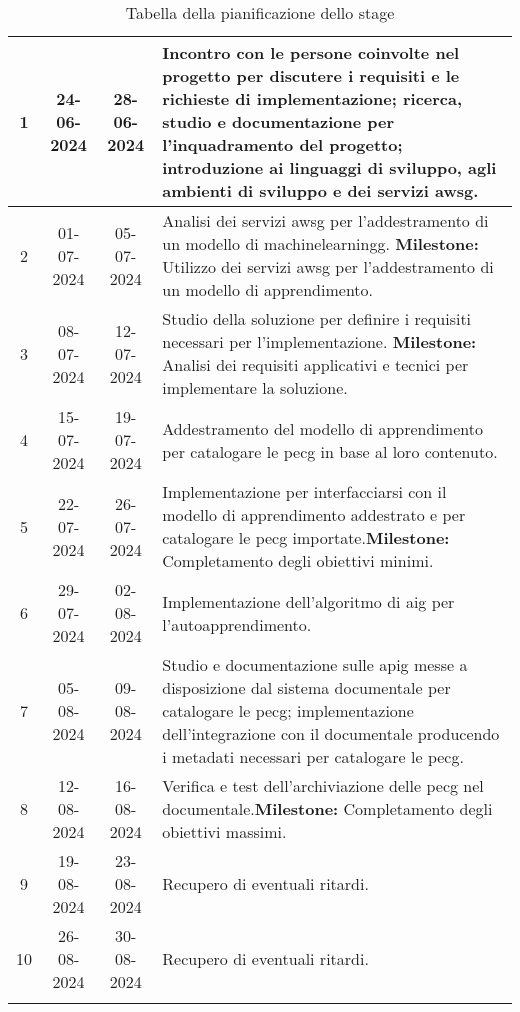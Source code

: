 \begin{longtable}{|c|c|c|p{8cm}|}
    1                  & 24-06-2024   & 28-06-2024  &
    Incontro con le persone coinvolte nel progetto per discutere i requisiti e le richieste di implementazione; ricerca, studio e documentazione per l'inquadramento del progetto; introduzione ai linguaggi di sviluppo, agli ambienti di sviluppo e dei servizi \gls{awsg}. \\
    \hline
    2                  & 01-07-2024   & 05-07-2024  &
    Analisi dei servizi \gls{awsg} per l'addestramento di un modello di \gls{machinelearningg}. \newline \textbf{Milestone:} Utilizzo dei servizi \gls{awsg} per l'addestramento di un modello di apprendimento. \\
    \hline
    3                  & 08-07-2024   & 12-07-2024  &
    Studio della soluzione per definire i requisiti necessari per l’implementazione. \newline \textbf{Milestone:} Analisi dei requisiti applicativi e tecnici per implementare la soluzione. \\
    \hline
    4                  & 15-07-2024   & 19-07-2024  &
    Addestramento del modello di apprendimento per catalogare le \gls{pecg} in base al loro contenuto. \\
    \hline
    5                  & 22-07-2024   & 26-07-2024  &
    Implementazione per interfacciarsi con il modello di apprendimento addestrato e per catalogare le \gls{pecg} importate.\newline \textbf{Milestone:} Completamento degli obiettivi minimi. \\
    \hline
    6                  & 29-07-2024   & 02-08-2024  &
    Implementazione dell'algoritmo di \gls{aig} per l’autoapprendimento. \\
    \hline
    7                  & 05-08-2024   & 09-08-2024  &
    Studio e documentazione sulle \gls{apig} messe a disposizione dal sistema documentale per catalogare le \gls{pecg}; implementazione dell’integrazione con il documentale producendo i metadati necessari per catalogare le \gls{pecg}. \\
    \hline
    8                  & 12-08-2024   & 16-08-2024  &
    Verifica e test dell'archiviazione delle \gls{pecg} nel documentale.\newline \textbf{Milestone:} Completamento degli obiettivi massimi. \\
    \hline
    9                  & 19-08-2024   & 23-08-2024  &
    Recupero di eventuali ritardi. \\
    \hline
    10                 & 26-08-2024   & 30-08-2024  &
    Recupero di eventuali ritardi. \\
    \hline
    \caption{Tabella della pianificazione dello stage} \\
\end{longtable}

